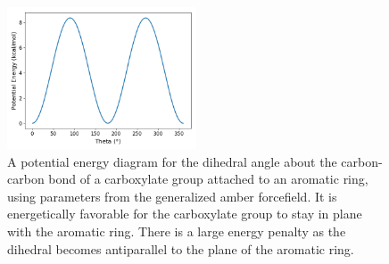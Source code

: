 \documentclass[journal=jpcbfk,manusciprt=article]{achemso}
\begin{document}
  \begin{figure}[!htb]
  \centering
  \includegraphics[width=0.5\textwidth]{carboxylate_dihedral_rb.png}
  \caption{A potential energy diagram for the dihedral angle about the carbon-carbon bond of
  a carboxylate group attached to an aromatic ring, using parameters from the generalized amber 
  forcefield. It is energetically favorable for the carboxylate group to stay in plane with 
  the aromatic ring. There is a large energy penalty as the dihedral becomes antiparallel to 
  the plane of the aromatic ring.}\label{fig:carboxylate_dihedral_rb}
  \end{figure}
  

\clearpage

\end{document}
